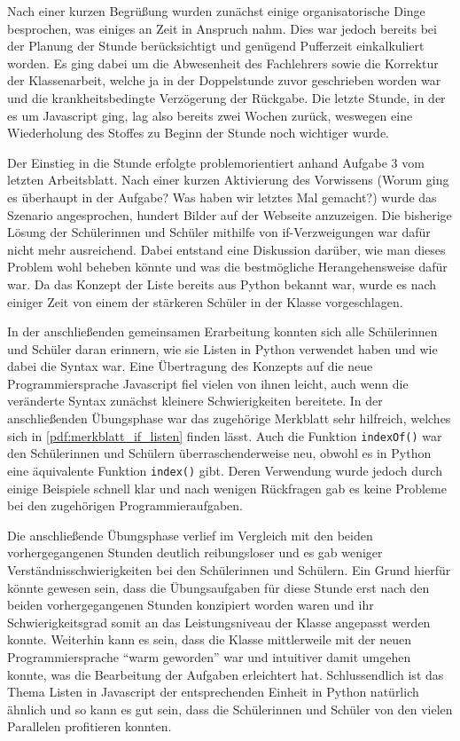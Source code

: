 Nach einer kurzen Begrüßung wurden zunächst einige organisatorische Dinge besprochen, was einiges an Zeit in Anspruch nahm.
Dies war jedoch bereits bei der Planung der Stunde berücksichtigt und genügend Pufferzeit einkalkuliert worden.
Es ging dabei um die Abwesenheit des Fachlehrers sowie die Korrektur der Klassenarbeit, welche ja in der Doppelstunde zuvor geschrieben worden war und die krankheitsbedingte Verzögerung der Rückgabe.
Die letzte Stunde, in der es um Javascript ging, lag also bereits zwei Wochen zurück, weswegen eine Wiederholung des Stoffes zu Beginn der Stunde noch wichtiger wurde.

Der Einstieg in die Stunde erfolgte problemorientiert anhand Aufgabe 3 vom letzten Arbeitsblatt.
Nach einer kurzen Aktivierung des Vorwissens (Worum ging es überhaupt in der Aufgabe? Was haben wir letztes Mal gemacht?) wurde das Szenario angesprochen, hundert Bilder auf der Webseite anzuzeigen.
Die bisherige Lösung der Schülerinnen und Schüler mithilfe von if-Verzweigungen war dafür nicht mehr ausreichend.
Dabei entstand eine Diskussion darüber, wie man dieses Problem wohl beheben könnte und was die bestmögliche Herangehensweise dafür war.
Da das Konzept der Liste bereits aus Python bekannt war, wurde es nach einiger Zeit von einem der stärkeren Schüler in der Klasse vorgeschlagen.

In der anschließenden gemeinsamen Erarbeitung konnten sich alle Schülerinnen und Schüler daran erinnern, wie sie Listen in Python verwendet haben und wie dabei die Syntax war.
Eine Übertragung des Konzepts auf die neue Programmiersprache Javascript fiel vielen von ihnen leicht, auch wenn die veränderte Syntax zunächst kleinere Schwierigkeiten bereitete.
In der anschließenden Übungsphase war das zugehörige Merkblatt sehr hilfreich, welches sich in \autoref{pdf:merkblatt_if_listen} finden lässt.
Auch die Funktion \texttt{indexOf()} war den Schülerinnen und Schülern überraschenderweise neu, obwohl es in Python eine äquivalente Funktion \texttt{index()} gibt.
Deren Verwendung wurde jedoch durch einige Beispiele schnell klar und nach wenigen Rückfragen gab es keine Probleme bei den zugehörigen Programmieraufgaben.

Die anschließende Übungsphase verlief im Vergleich mit den beiden vorhergegangenen Stunden deutlich reibungsloser und es gab weniger Verständnisschwierigkeiten bei den Schülerinnen und Schülern.
Ein Grund hierfür könnte gewesen sein, dass die Übungsaufgaben für diese Stunde erst nach den beiden vorhergegangenen Stunden konzipiert worden waren und ihr Schwierigkeitsgrad somit an das Leistungsniveau der Klasse angepasst werden konnte.
Weiterhin kann es sein, dass die Klasse mittlerweile mit der neuen Programmiersprache ``warm geworden'' war und intuitiver damit umgehen konnte, was die Bearbeitung der Aufgaben erleichtert hat.
Schlussendlich ist das Thema Listen in Javascript der entsprechenden Einheit in Python natürlich ähnlich und so kann es gut sein, dass die Schülerinnen und Schüler von den vielen Parallelen profitieren konnten.

